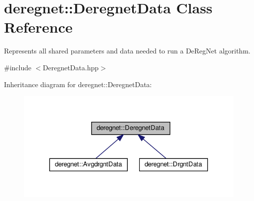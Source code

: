 \hypertarget{classderegnet_1_1DeregnetData}{}\section{deregnet\+:\+:Deregnet\+Data Class Reference}
\label{classderegnet_1_1DeregnetData}


Represents all shared parameters and data needed to run a De\+Reg\+Net algorithm.  




{\ttfamily \#include $<$Deregnet\+Data.\+hpp$>$}



Inheritance diagram for deregnet\+:\+:Deregnet\+Data\+:\nopagebreak
\begin{figure}[H]
\begin{center}
\leavevmode
\includegraphics[width=324pt]{classderegnet_1_1DeregnetData__inherit__graph}
\end{center}
\end{figure}
